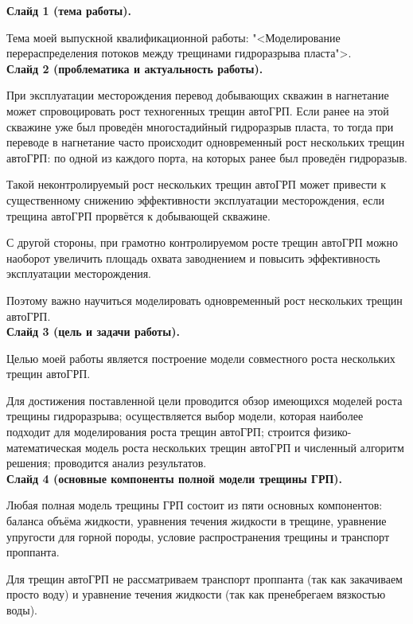 \documentclass[a4paper, 12pt]{article}
\begin{document}

\textbf{Слайд 1 (тема работы).}

Тема моей выпускной квалификационной работы: "<Моделирование перераспределения потоков между трещинами гидроразрыва пласта">.\\

\textbf{Слайд 2 (проблематика и актуальность работы).}

При эксплуатации месторождения перевод добывающих скважин в нагнетание может спровоцировать рост техногенных трещин автоГРП.
Если ранее на этой скважине уже был проведён многостадийный гидроразрыв пласта, то тогда при переводе в нагнетание часто происходит одновременный рост нескольких трещин автоГРП: по одной из каждого порта, на которых ранее был проведён гидроразыв.

Такой неконтролируемый рост нескольких трещин автоГРП может привести к существенному снижению эффективности эксплуатации месторождения, если трещина автоГРП прорвётся к добывающей скважине.

С другой стороны, при грамотно контролируемом росте трещин автоГРП можно наоборот увеличить площадь охвата заводнением и повысить эффективность эксплуатации месторождения.

Поэтому важно научиться моделировать одновременный рост нескольких трещин автоГРП.\\ 

\textbf{Слайд 3 (цель и задачи работы).}

Целью моей работы является построение модели совместного роста нескольких трещин автоГРП.

Для достижения поставленной цели проводится обзор имеющихся моделей роста трещины гидроразрыва;
осуществляется выбор модели, которая наиболее подходит для моделирования роста трещин автоГРП;
строится физико-математическая модель роста нескольких трещин автоГРП и численный алгоритм решения;
проводится анализ результатов.\\

\textbf{Слайд 4 (основные компоненты полной модели трещины ГРП).}

Любая полная модель трещины ГРП состоит из пяти основных компонентов: баланса объёма жидкости, уравнения течения жидкости в трещине, уравнение упругости для горной породы, условие распространения трещины и транспорт проппанта.

Для трещин автоГРП не рассматриваем транспорт проппанта (так как закачиваем просто воду) и уравнение течения жидкости (так как пренебрегаем вязкостью воды).
\end{document}
